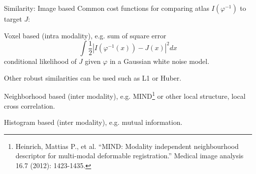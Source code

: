 \documentclass{beamer}
\begin{document}
\begin{frame}{Similarity: Image based}
Common cost functions for comparing atlas $I(\varphi^{-1})$ to target $J$:

\vspace{1em}


\alert{Voxel based (intra modality)}, e.g. sum of square error
$$
\int \frac12 |I(\varphi^{-1}(x)) - J(x)|^2 dx
$$
conditional \alert{likelihood} of $J$ given $\varphi$ in a Gaussian white noise model.  

Other robust similarities can be used such as L1 or Huber.

\vspace{1em}


\alert{Neighborhood based (inter modality)}, e.g. MIND\footnote{Heinrich, Mattias P., et al. ``MIND: Modality independent neighbourhood descriptor for multi-modal deformable registration.'' Medical image analysis 16.7 (2012): 1423-1435.} or other local structure, local cross correlation.

\vspace{1em}

\alert{Histogram based  (inter modality)}, e.g. mutual information.



\end{frame}
\end{document}
